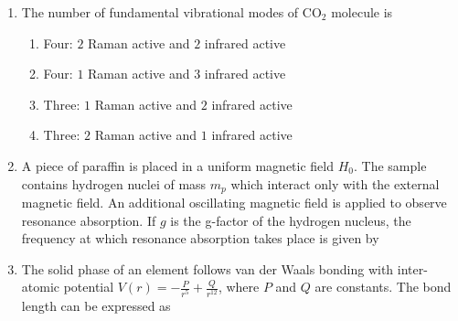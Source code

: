 \documentclass[journal,12pt,onecolumn]{IEEEtran}
\begin{document}
\begin{enumerate}[itemsep = 1em]
\hfill{}
\begin{enumerate}
\end{enumerate}

\item The number of fundamental vibrational modes of CO$_{2}$ molecule is

\hfill{}
\begin{enumerate}

\item Four: $2$ Raman active and $2$ infrared active
\item Four: $1$ Raman active and $3$ infrared active
\item Three: $1$ Raman active and $2$ infrared active
\item Three: $2$ Raman active and $1$ infrared active

\end{enumerate}


\item A piece of paraffin is placed in a uniform magnetic field $H_{0}$. The sample contains hydrogen nuclei of mass $m_{p}$ which interact only with the external magnetic field. An additional oscillating magnetic field is applied to observe resonance absorption. If $g$ is the g-factor of the hydrogen nucleus, the frequency at which resonance absorption takes place is given by

\hfill{}
\begin{enumerate}
\end{enumerate}

\item The solid phase of an element follows van der Waals bonding with inter-atomic potential $V(r) = - \frac{P}{r^5} + \frac{Q}{r^{12}}$, where $P$ and $Q$ are constants. The bond length can be expressed as


\end{enumerate}
\end{document}
